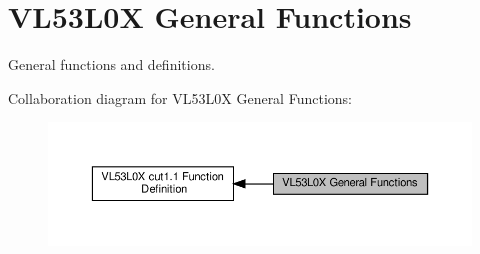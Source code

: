 \hypertarget{group__VL53L0X__general__group}{}\section{V\+L53\+L0X General Functions}
\label{group__VL53L0X__general__group}


General functions and definitions.  


Collaboration diagram for V\+L53\+L0X General Functions\+:\nopagebreak
\begin{figure}[H]
\begin{center}
\leavevmode
\includegraphics[width=350pt]{group__VL53L0X__general__group}
\end{center}
\end{figure}
